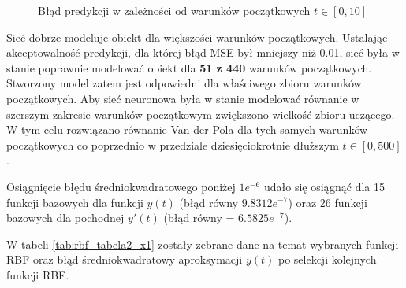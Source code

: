 \begin{figure}[ht!]
	\centering

	

	\caption{Błąd predykcji w zależności od warunków początkowych $t \in [0,10]$}
	\label{img:err_initial}
\end{figure}

Sieć dobrze modeluje obiekt dla większości warunków początkowych. Ustalając akceptowalność predykcji, dla której błąd MSE był mniejszy niż 0.01, sieć była w stanie poprawnie modelować obiekt dla \textbf{51 z 440} warunków początkowych. Stworzony model zatem jest odpowiedni dla właściwego zbioru warunków początkowych. Aby sieć neuronowa była w stanie modelować równanie w szerszym zakresie warunków początkowym zwiększono wielkość zbioru uczącego. W tym celu rozwiązano równanie Van der Pola dla tych samych warunków początkowych co poprzednio w przedziale dziesięciokrotnie dłuższym $t \in [0,500]$.

Osiągnięcie błędu średniokwadratowego poniżej $1e^{-6}$ udało się osiągnąć dla 15 funkcji bazowych dla funkcji $y(t)$ (błąd równy $9.8312e^{-7}$) oraz 26 funkcji bazowych dla pochodnej $y'(t)$ (błąd równy = $6.5825e^{-7}$).

W tabeli \ref{tab:rbf_tabela2_x1} zostały zebrane dane na temat wybranych funkcji RBF oraz błąd średniokwadratowy aproksymacji $y(t)$ po selekcji kolejnych funkcji RBF.

